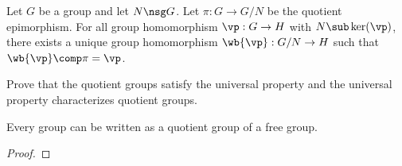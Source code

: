 \documentclass[10pt]{article}
\begin{document}
\begin{Universal property for quotient groups}
    Let $G$ be a group and let $N\nsg G$. Let $\pi:G\to G/N$ be the quotient epimorphism. For all group homomorphism $\vp:G\to H$ with $N\sub\ker(\vp)$, there exists a unique group homomorphism $\wb{\vp}:G/N\to H$ such that $\wb{\vp}\comp\pi=\vp$.
\end{Universal property for quotient groups}
\begin{center}
\end{center}
\begin{problem}
    Prove that the quotient groups satisfy the universal property and the universal property characterizes quotient groups.
\end{problem}
\begin{proposition}
    Every group can be written as a quotient group of a free group.
\end{proposition}
\begin{proof}
    
\end{proof}
\end{document}
